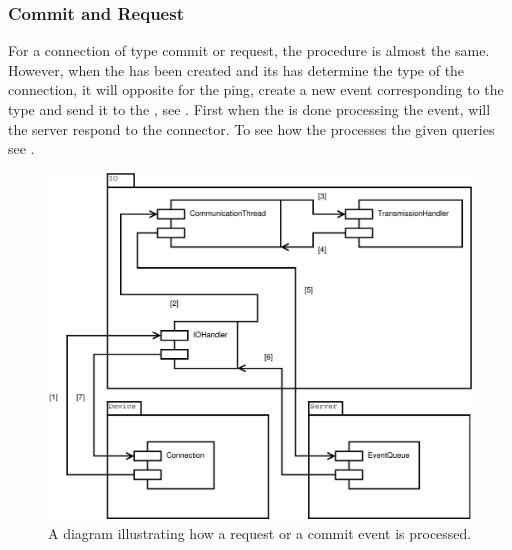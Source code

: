 \subsubsection{Commit and Request}
\label{sec:IOCR}
For a connection of type commit or request, the procedure is almost the same. However, when the  has been created and its  has determine the type of the connection, it will opposite for the ping, create a new event corresponding to the type and send it to the , see .
First when the  is done processing the event, will the server respond to the connector.
To see how the  processes the given queries see .

\begin{figure}[htbp]
	\centering
		\includegraphics[scale=0.30]{images/requestCommit}
	\caption{A diagram illustrating how a request or a commit event is processed.}
	\label{fig:IOCR}
\end{figure}